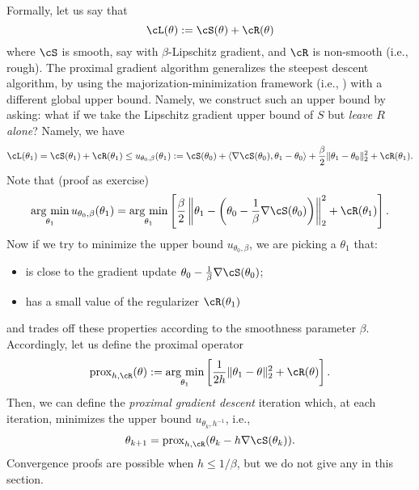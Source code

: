 \documentclass[../../book-main.tex]{subfiles}
\begin{document}
Formally, let us say that 
\begin{equation}
    \cL(\theta) := \cS(\theta) + \cR(\theta)
\end{equation}
where \(\cS\) is smooth, say with \(\beta\)-Lipschitz gradient, and \(\cR\) is non-smooth (i.e., rough). The proximal gradient algorithm generalizes the steepest descent algorithm, by using the majorization-minimization framework (i.e., ) with a different global upper bound. Namely, we construct such an upper bound by asking: what if we take the Lipschitz gradient upper bound of \(S\) but \textit{leave \(R\) alone}?  Namely, we have 
\begin{equation}
    \cL(\theta_{1}) = \cS(\theta_{1}) + \cR(\theta_{1}) \leq u_{\theta_{0}, \beta}(\theta_{1}) := \cS(\theta_{0}) + \ip{\nabla \cS(\theta_{0})}{\theta_{1} - \theta_{0}} + \frac{\beta}{2}\norm{\theta_{1} - \theta_{0}}_{2}^{2} + \cR(\theta_{1}).
\end{equation}
Note that (proof as exercise)
\begin{equation}
    \argmin_{\theta_{1}}u_{\theta_{0}, \beta}(\theta_{1}) = \argmin_{\theta_{1}}\bs{\frac{\beta}{2}\norm*{\theta_{1} - \bp{\theta_{0} - \frac{1}{\beta}\nabla \cS(\theta_{0})}}_{2}^{2} + \cR(\theta_{1})}.
\end{equation}
Now if we try to minimize the upper bound \(u_{\theta_{0}, \beta}\), we are picking a \(\theta_{1}\) that:
\begin{itemize}
    \item is close to the gradient update \(\theta_{0} - \frac{1}{\beta}\nabla \cS(\theta_{0})\);
    \item has a small value of the regularizer \(\cR(\theta_{1})\)
\end{itemize}
and trades off these properties according to the smoothness parameter \(\beta\). Accordingly, let us define the proximal operator
\begin{equation}
    \prox_{h, \cR}(\theta) := \argmin_{\theta_{1}}\bs{\frac{1}{2h}\norm{\theta_{1} - \theta}_{2}^{2} + \cR(\theta)}.
\end{equation}
Then, we can define the \textit{proximal gradient descent} iteration which, at each iteration, minimizes the upper bound \(u_{\theta_{k}, h^{-1}}\), i.e.,
\begin{equation}
    \theta_{k + 1} = \prox_{h, \cR}(\theta_{k} - h\nabla \cS(\theta_{k})).
\end{equation}
Convergence proofs are possible when \(h \leq 1/\beta\), but we do not give any in this section.
\end{document}
